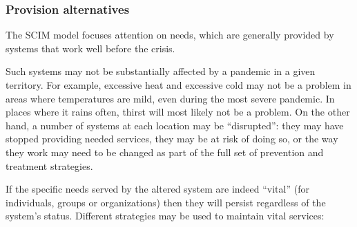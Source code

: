 \documentclass[12pt, a4]{scrartcl}
\begin{document}
\subsubsection{Provision alternatives}
The SCIM model focuses attention on needs, which are generally provided by systems that work well before the crisis.

Such systems may not be substantially affected by a pandemic in a given territory. For example, excessive heat and excessive cold may not be a problem in areas where temperatures are mild, even during the most severe pandemic. In places where it rains often, thirst will most likely not be a problem. On the other hand, a number of systems at each location may be “disrupted”: they may have stopped providing needed services, they may be at risk of doing so, or the way they work may need to be changed as part of the full set of prevention and treatment strategies.

If the specific needs served by the altered system are indeed “vital” (for individuals, groups or organizations) then they will persist regardless of the system’s status. Different strategies may be used to maintain vital services:
\end{document}
